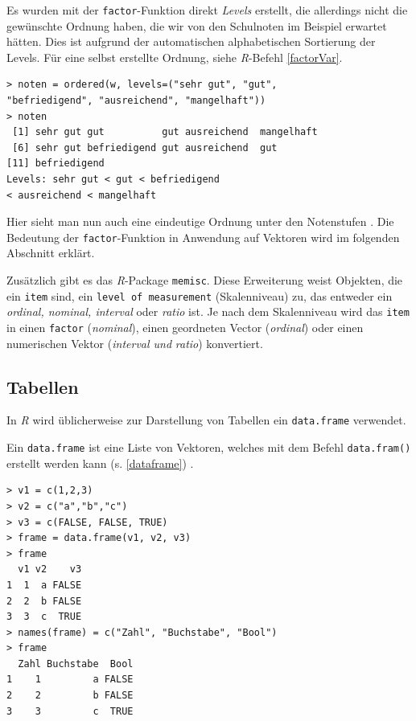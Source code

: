 \documentclass[a4paper, 12pt]{report} %
\begin{document}
Es wurden mit der \texttt{factor}-Funktion direkt \textit{Levels} erstellt, die allerdings nicht die gewünschte Ordnung haben, die wir von den Schulnoten im Beispiel erwartet hätten. Dies ist aufgrund der automatischen alphabetischen Sortierung der Levels. Für eine selbst erstellte Ordnung, siehe \textit{R}-Befehl \ref{factorVar}. 

\lstset{language=R}
\begin{lstlisting}[frame=single,caption={Ordnen einer selbsterstellten \texttt{factor Variable}}]
> noten = ordered(w, levels=("sehr gut", "gut", 
"befriedigend", "ausreichend", "mangelhaft"))
> noten
 [1] sehr gut gut          gut ausreichend  mangelhaft  
 [6] sehr gut befriedigend gut ausreichend  gut         
[11] befriedigend
Levels: sehr gut < gut < befriedigend 
< ausreichend < mangelhaft
\end{lstlisting}
\label{factorVar}

Hier sieht man nun auch eine eindeutige Ordnung unter den Notenstufen \cite{factorVariables}. Die Bedeutung der \texttt{factor}-Funktion in Anwendung auf Vektoren wird im folgenden Abschnitt erklärt. 

Zusätzlich gibt es das \textit{R}-Package \texttt{memisc}. Diese Erweiterung weist Objekten, die ein \texttt{item} sind, ein \texttt{level of measurement} (Skalenniveau) zu, das entweder ein \textit{ordinal, nominal, interval} oder \textit{ratio} ist. Je nach dem Skalenniveau wird das \texttt{item} in einen \texttt{factor} (\textit{nominal}), einen geordneten Vector (\textit{ordinal}) oder einen numerischen Vektor (\textit{interval und} \textit{ratio}) konvertiert. 

\subsection{Tabellen}

In \textit{R} wird üblicherweise zur Darstellung von Tabellen ein \texttt{data.frame} verwendet. 

Ein \texttt{data.frame} ist eine Liste von Vektoren, welches mit dem Befehl \texttt{data.fram()} erstellt werden kann (s. \ref{dataframe}) \cite{dataFrame}.

\lstset{language=R}
\begin{lstlisting}[frame=single,caption={\texttt{data.frame} aus 3 Vektoren}]
> v1 = c(1,2,3)
> v2 = c("a","b","c")
> v3 = c(FALSE, FALSE, TRUE)
> frame = data.frame(v1, v2, v3)
> frame
  v1 v2    v3
1  1  a FALSE
2  2  b FALSE
3  3  c  TRUE
> names(frame) = c("Zahl", "Buchstabe", "Bool")
> frame
  Zahl Buchstabe  Bool
1    1         a FALSE
2    2         b FALSE
3    3         c  TRUE

\end{lstlisting}
\label{dataframe}
\end{document}
